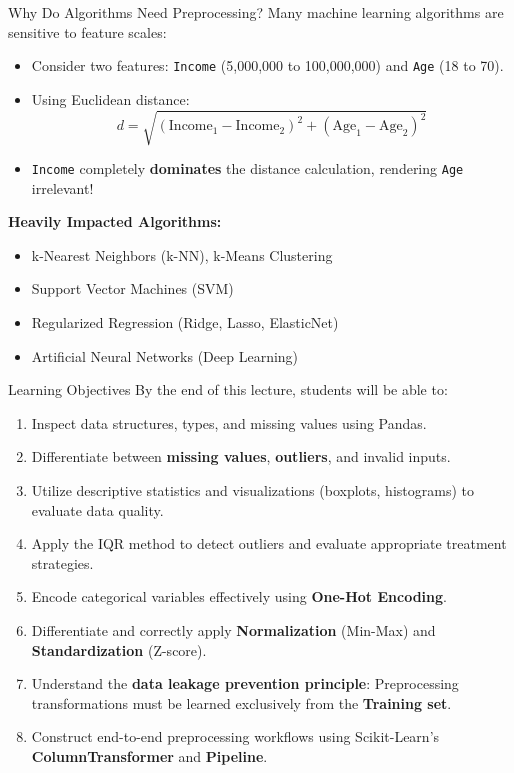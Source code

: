 \documentclass[aspectratio=169,11pt]{beamer}
\newcommand{\code}[1]{\texttt{#1}}
\newcommand{\smallgap}{\vspace{0.35em}}
\begin{document}
\begin{frame}{Why Do Algorithms Need Preprocessing?}
Many machine learning algorithms are sensitive to feature scales:
\begin{itemize}
  \item Consider two features: \code{Income} (5,000,000 to 100,000,000) and \code{Age} (18 to 70).
  \item Using Euclidean distance:
  \[
  d = \sqrt{(\text{Income}_1 - \text{Income}_2)^2 + (\text{Age}_1 - \text{Age}_2)^2}
  \]
  \item \code{Income} completely \textbf{dominates} the distance calculation, rendering \code{Age} irrelevant!
\end{itemize}

\smallgap
\textbf{Heavily Impacted Algorithms:}
\begin{itemize}
  \item k-Nearest Neighbors (k-NN), k-Means Clustering
  \item Support Vector Machines (SVM)
  \item Regularized Regression (Ridge, Lasso, ElasticNet)
  \item Artificial Neural Networks (Deep Learning)
\end{itemize}
\end{frame}

\begin{frame}{Learning Objectives}
By the end of this lecture, students will be able to:
\begin{enumerate}
  \item Inspect data structures, types, and missing values using Pandas.
  \item Differentiate between \textbf{missing values}, \textbf{outliers}, and invalid inputs.
  \item Utilize descriptive statistics and visualizations (boxplots, histograms) to evaluate data quality.
  \item Apply the IQR method to detect outliers and evaluate appropriate treatment strategies.
  \item Encode categorical variables effectively using \textbf{One-Hot Encoding}.
  \item Differentiate and correctly apply \textbf{Normalization} (Min-Max) and \textbf{Standardization} (Z-score).
  \item Understand the \textbf{data leakage prevention principle}: Preprocessing transformations must be learned exclusively from the \textbf{Training set}.
  \item Construct end-to-end preprocessing workflows using Scikit-Learn's \textbf{ColumnTransformer} and \textbf{Pipeline}.
\end{enumerate}
\end{frame}
\end{document}

